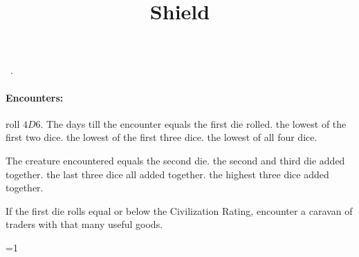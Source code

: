 \documentclass[a4paper,openany]{book}
\title{\Glsentrytext{gm} Shield}
\begin{document}


\cleardoublepage

\begin{figure*}[b!]
  \stackingDamageChart
\end{figure*}

\begin{multicols}{2}

\orrery

\noindent
\showCycle~\cycleDesc.

\paragraph{Encounters:}
roll $4D6$.
The days till the encounter equals the
\ifcase\value{temperature}%
  first die rolled. 
\or%
  the lowest of the first two dice.
\or%
  the lowest of the first three dice.
\or%
  the lowest of all four dice.
\fi

The creature encountered equals
\ifcase\value{temperature}%
  the second die.
\or%
  the second and third die added together.
\or%
  the last three dice all added together.
\else%
  the highest three dice added together.
\fi%

\ifcase\value{temperature}%
  \setcounter{enc}{13}
  \setcounter{diceNo}{7}
  \begin{boxtable}[L|r|Lc]
    \hline
  \end{boxtable}
\or%
  \setcounter{enc}{13}
  \begin{boxtable}[L|r|Lc]
  \end{boxtable}
  \setcounter{diceNo}{5}
\else%
  \allEncounterTables%
\fi

If the first die rolls equal or below the Civilization Rating, encounter a caravan of traders with that many useful goods.

\ifnum\value{temperature}=1
\fi


\end{multicols}
\end{document}
